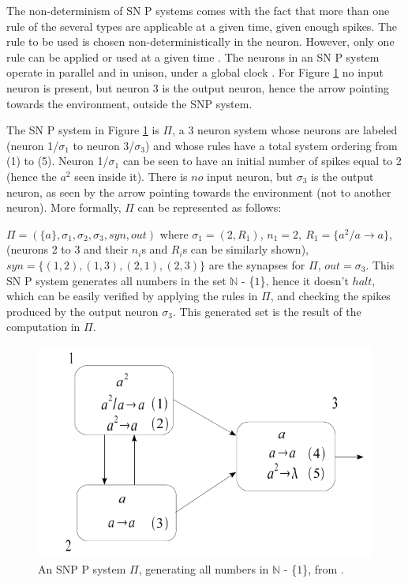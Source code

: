 \documentclass{svmultm}
\begin{document}
The non-determinism of SN P systems comes with the fact
that more than one rule of the several types are applicable at a given time, given enough spikes. The rule to be used is
chosen non-deterministically in the neuron. However, only
one rule can be applied or used at a given time \cite{snp,snpbrain,snpmat}. The
neurons in an SN P system operate in parallel and in unison,
under a global clock \cite{snp}. For Figure \ref{snp_ex} no input neuron is present,
but neuron 3 is the output neuron, hence the arrow pointing
towards the environment, outside the SNP system.

The SN P system in Figure \ref{snp_ex} is $\Pi$, a 3 neuron system whose neurons are labeled (neuron 1/$\sigma_1$ to neuron 3/$\sigma_3$) and whose rules have a total system ordering from (1) to (5). Neuron 1/$\sigma_1$ can be seen to have an initial number of spikes equal to 2 (hence the $a^2$ seen inside it). There is $no$ input neuron, but $\sigma_3$ is the output neuron, as seen by the arrow pointing towards the environment (not to another neuron). More formally, $\Pi$ can be represented as follows:

$\Pi = (\{a\}, \sigma_1, \sigma_2, \sigma_3, syn, out)$ where $\sigma_1 = (2, R_1)$, $n_1 = 2, ~R_1 = \{a^2/a \rightarrow a\}$, (neurons 2 to 3 and their $n_i$s and $R_i$s can be similarly shown), $syn = \{(1,2),(1,3),(2,1),(2,3)\}$ are the synapses for $\Pi$, $out= \sigma_3$. This SN P system generates all numbers in the set $\mathbb N$ - \{$1$\}, hence it doesn't $halt$, which can be easily verified by applying the rules in $\Pi$, and checking the spikes produced by the output neuron $\sigma_3$. This generated set is the result of the computation in $\Pi$.


	\begin{figure}[h]
		\centering
		\includegraphics[scale=.35]{figures/snp-img.png} 
		\caption{An SNP P system $\Pi$, generating all numbers in $\mathbb N$ - \{$1$\}, from \cite{snpmat}.}
		\label{snp_ex}
	\end{figure}
\end{document}
